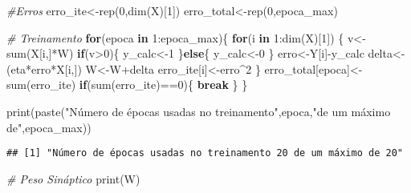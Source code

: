 \documentclass[
]{article}
\newenvironment{Shaded}{\begin{snugshade}}{\end{snugshade}}
\newcommand{\CommentTok}[1]{\textcolor[rgb]{0.56,0.35,0.01}{\textit{#1}}}
\newcommand{\ControlFlowTok}[1]{\textcolor[rgb]{0.13,0.29,0.53}{\textbf{#1}}}
\newcommand{\DecValTok}[1]{\textcolor[rgb]{0.00,0.00,0.81}{#1}}
\newcommand{\FunctionTok}[1]{\textcolor[rgb]{0.00,0.00,0.00}{#1}}
\newcommand{\NormalTok}[1]{#1}
\newcommand{\OtherTok}[1]{\textcolor[rgb]{0.56,0.35,0.01}{#1}}
\newcommand{\SpecialCharTok}[1]{\textcolor[rgb]{0.00,0.00,0.00}{#1}}
\newcommand{\StringTok}[1]{\textcolor[rgb]{0.31,0.60,0.02}{#1}}
\begin{document}
\begin{Shaded}
\begin{Highlighting}[]
\CommentTok{\#Erros}
\NormalTok{erro\_ite}\OtherTok{\textless{}{-}}\FunctionTok{rep}\NormalTok{(}\DecValTok{0}\NormalTok{,}\FunctionTok{dim}\NormalTok{(X)[}\DecValTok{1}\NormalTok{])}
\NormalTok{erro\_total}\OtherTok{\textless{}{-}}\FunctionTok{rep}\NormalTok{(}\DecValTok{0}\NormalTok{,epoca\_max)}

\CommentTok{\# Treinamento}
\ControlFlowTok{for}\NormalTok{(epoca }\ControlFlowTok{in} \DecValTok{1}\SpecialCharTok{:}\NormalTok{epoca\_max)\{}
  \ControlFlowTok{for}\NormalTok{(i }\ControlFlowTok{in} \DecValTok{1}\SpecialCharTok{:}\FunctionTok{dim}\NormalTok{(X)[}\DecValTok{1}\NormalTok{]) \{}
\NormalTok{    v}\OtherTok{\textless{}{-}}\FunctionTok{sum}\NormalTok{(X[i,]}\SpecialCharTok{*}\NormalTok{W)}
    \ControlFlowTok{if}\NormalTok{(v}\SpecialCharTok{\textgreater{}}\DecValTok{0}\NormalTok{)\{}
\NormalTok{      y\_calc}\OtherTok{\textless{}{-}}\DecValTok{1}
\NormalTok{    \}}\ControlFlowTok{else}\NormalTok{\{}
\NormalTok{      y\_calc}\OtherTok{\textless{}{-}}\DecValTok{0}
\NormalTok{    \}}
\NormalTok{    erro}\OtherTok{\textless{}{-}}\NormalTok{Y[i]}\SpecialCharTok{{-}}\NormalTok{y\_calc}
\NormalTok{    delta}\OtherTok{\textless{}{-}}\NormalTok{(eta}\SpecialCharTok{*}\NormalTok{erro}\SpecialCharTok{*}\NormalTok{X[i,])}
\NormalTok{    W}\OtherTok{\textless{}{-}}\NormalTok{W}\SpecialCharTok{+}\NormalTok{delta}
\NormalTok{    erro\_ite[i]}\OtherTok{\textless{}{-}}\NormalTok{erro}\SpecialCharTok{\^{}}\DecValTok{2}
\NormalTok{  \}}
\NormalTok{  erro\_total[epoca]}\OtherTok{\textless{}{-}}\FunctionTok{sum}\NormalTok{(erro\_ite)}
  \ControlFlowTok{if}\NormalTok{(}\FunctionTok{sum}\NormalTok{(erro\_ite)}\SpecialCharTok{==}\DecValTok{0}\NormalTok{)\{}
    \ControlFlowTok{break}
\NormalTok{  \}}
\NormalTok{\}}

\FunctionTok{print}\NormalTok{(}\FunctionTok{paste}\NormalTok{(}\StringTok{"Número de épocas usadas no treinamento"}\NormalTok{,epoca,}\StringTok{"de um máximo de"}\NormalTok{,epoca\_max))}
\end{Highlighting}
\end{Shaded}

\begin{verbatim}
## [1] "Número de épocas usadas no treinamento 20 de um máximo de 20"
\end{verbatim}

\begin{Shaded}
\begin{Highlighting}[]
\CommentTok{\# Peso Sináptico}
\FunctionTok{print}\NormalTok{(W)}
\end{Highlighting}
\end{Shaded}
\end{document}
